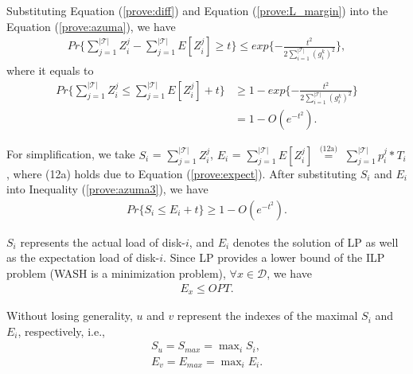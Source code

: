 \documentclass[conference]{IEEEtran}
\begin{document}
\vspace{-0.1cm}
Substituting Equation (\ref{prove:diff}) and Equation (\ref{prove:L_margin}) into the  Equation (\ref{prove:azuma}), we have  
\vspace{-0.2cm}
\begin{align}
Pr\{\sum\nolimits_{j = 1}^{|\mathcal{T}|} Z_i^j - 
	\sum\nolimits_{j = 1}^{|\mathcal{T}|} E[Z_i^j]\geq t\} \leq exp\{-\frac{t^2}{2\sum_{ i = 1 }^{|\mathcal{T}|}(g_i^k)^2}\},\nonumber
\end{align}
 \vspace{-0.2cm}
 where it equals to
\begin{align}
Pr\{\sum_{j = 1}^{|\mathcal{T}|} Z_i^j \leq \sum_{j = 1}^{|\mathcal{T}|} E[Z_i^j] + t\} & \geq 1 - exp\{-\frac{t^2}{2\sum_{ i = 1 }^{|\mathcal{T}|}(g_i^k)^2}\}\nonumber\\
& = 1 - O(e^{-t^2}).\label{prove:azuma3}
\end{align}

\vspace{-0.2cm}
For simplification, we take $S_i$  = $\sum_{j = 1}^{|\mathcal{T}|} Z_i^j$,
$E_i$ = $\sum_{j = 1}^{|\mathcal{T}|} E[Z_i^j]$
$\overset{\text{(12a)}}{=}$
$\sum_{j = 1}^{|\mathcal{T}|} p_i^j*T_i$, where (12a) holds due to Equation (\ref{prove:expect}). After substituting $S_i$ and $E_i$ into Inequality (\ref{prove:azuma3}), we have
\vspace{-0.2cm}
\begin{align}
Pr\{S_i \leq E_i + t\} \geq 1- O(e^{-t^2}). \label{prove:SU}
\end{align}

\vspace{-0.2cm}
$S_i$ represents the actual load of disk-$i$, and $E_i$ denotes the solution of LP as well as the expectation load of disk-$i$. Since LP provides a lower bound of the ILP problem (WASH is a minimization problem), $\forall x \in \mathcal{D}$, we have
\vspace{-0.2cm}
\begin{align}
E_x \leq OPT.\label{prove:OPT}
\end{align}

\vspace{-0.2cm}
Without losing generality, $u$ and $v$ represent the indexes of the maximal $S_i$ and $E_i$, respectively, i.e.,
\vspace{-0.2cm}
\begin{align}
	S_u = S_{max} = \max\nolimits_i S_i,\\
	E_v = E_{max} = \max\nolimits_i E_i.\label{prove:Emax}
\end{align}
\end{document}
